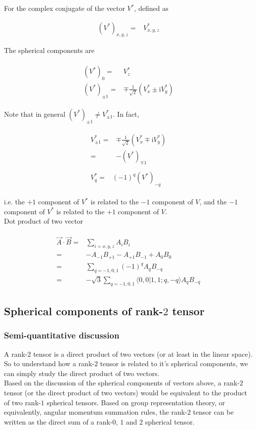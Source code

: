 \documentclass[10pt,fleqn]{article}
\newcommand{\ui}{\mathrm{i}}
\newcommand{\eqar}[1]
{
  \begin{align}
    #1
  \end{align}
}
\newcommand{\paren}[1]{{\left({#1}\right)}}
\begin{document}
For the complex conjugate of the vector $V^*$, defined as
\eqar{
  (V^*)_{x,y,z}=&V^*_{x,y,z}
}
The spherical components are
\eqar{
  \begin{split}
    (V^*)_0=&V^*_z\\
    (V^*)_{\pm1}=&\mp\frac{1}{\sqrt2}\paren{V^*_x\pm\ui V^*_y}
  \end{split}\label{eq:spherical:conj}
}
Note that in general $(V^*)_{\pm1}\neq V^*_{\pm1}$. In fact,
\eqar{
  \begin{split}
    V^*_{\pm1}=&\mp\frac{1}{\sqrt2}\paren{V^*_x\mp\ui V^*_y}\\
    =&-(V^*)_{\mp1}
  \end{split}\\
  \begin{split}
    V^*_q=&(-1)^q(V^*)_{-q}
  \end{split}
}
i.e. the $+1$ component of $V^*$ is related to the $-1$ component of $V$,
and the $-1$ component of $V^*$ is related to the $+1$ component of $V$.\\

Dot product of two vector
\eqar{
  \begin{split}
    \vec A\cdot\vec B=&\sum_{i=x,y,z}A_iB_i\\
    =&-A_{-1}B_{+1}-A_{+1}B_{-1}+A_0B_0\\
    =&\sum_{q=-1,0,1}(-1)^qA_{q}B_{-q}\\
    =&-\sqrt{3}\sum_{q=-1,0,1}\langle 0,0|1,1;q,-q\rangle A_{q}B_{-q}
  \end{split}
}

\subsection{Spherical components of rank-$2$ tensor}

\subsubsection{Semi-quantitative discussion}

A rank-$2$ tensor is a direct product of two vectors (or at least in the linear space).
So to understand how a rank-$2$ tensor is related to it's spherical components,
we can simply study the direct product of two vectors.\\

Based on the discussion of the spherical components of vectors above,
a rank-$2$ tensor (or the direct product of two vectors) would be
equivalent to the product of two rank-$1$ spherical tensors.
Based on group representation theory, or equivalently,
angular momentum summation rules, the rank-$2$ tensor can be written
as the direct sum of a rank-$0$, $1$ and $2$ spherical tensor.\\
\end{document}
